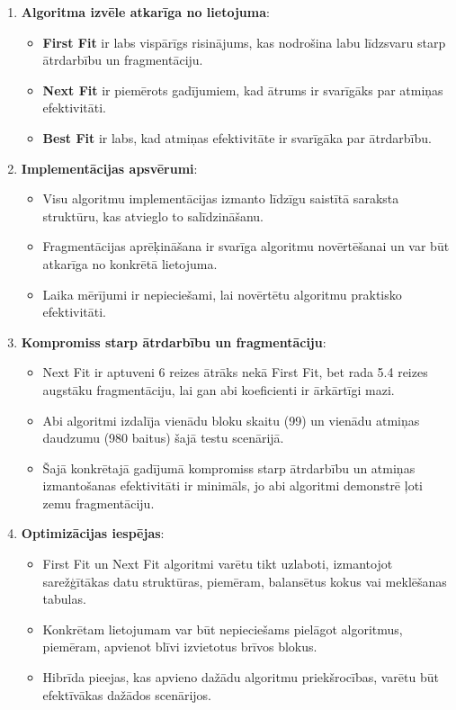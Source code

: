 \documentclass{report}
\begin{document}
	\begin{enumerate}
		\item \textbf{Algoritma izvēle atkarīga no lietojuma}:
		\begin{itemize}
			\item \textbf{First Fit} ir labs vispārīgs risinājums, kas nodrošina labu līdzsvaru starp ātrdarbību un fragmentāciju.
			\item \textbf{Next Fit} ir piemērots gadījumiem, kad ātrums ir svarīgāks par atmiņas efektivitāti.
			\item \textbf{Best Fit} ir labs, kad atmiņas efektivitāte ir svarīgāka par ātrdarbību.
		\end{itemize}
		
		\item \textbf{Implementācijas apsvērumi}:
		\begin{itemize}
			\item Visu algoritmu implementācijas izmanto līdzīgu saistītā saraksta struktūru, kas atvieglo to salīdzināšanu.
			\item Fragmentācijas aprēķināšana ir svarīga algoritmu novērtēšanai un var būt atkarīga no konkrētā lietojuma.
			\item Laika mērījumi ir nepieciešami, lai novērtētu algoritmu praktisko efektivitāti.
		\end{itemize}
		
		\item \textbf{Kompromiss starp ātrdarbību un fragmentāciju}:
		\begin{itemize}
			\item Next Fit ir aptuveni 6 reizes ātrāks nekā First Fit, bet rada 5.4 reizes augstāku fragmentāciju, lai gan abi koeficienti ir ārkārtīgi mazi.
			\item Abi algoritmi izdalīja vienādu bloku skaitu (99) un vienādu atmiņas daudzumu (980 baitus) šajā testu scenārijā.
			\item Šajā konkrētajā gadījumā kompromiss starp ātrdarbību un atmiņas izmantošanas efektivitāti ir minimāls, jo abi algoritmi demonstrē ļoti zemu fragmentāciju.
		\end{itemize}
		
		\item \textbf{Optimizācijas iespējas}:
		\begin{itemize}
			\item First Fit un Next Fit algoritmi varētu tikt uzlaboti, izmantojot sarežģītākas datu struktūras, piemēram, balansētus kokus vai meklēšanas tabulas.
			\item Konkrētam lietojumam var būt nepieciešams pielāgot algoritmus, piemēram, apvienot blīvi izvietotus brīvos blokus.
			\item Hibrīda pieejas, kas apvieno dažādu algoritmu priekšrocības, varētu būt efektīvākas dažādos scenārijos.
		\end{itemize}
		
	\end{enumerate}
	
\end{document}
